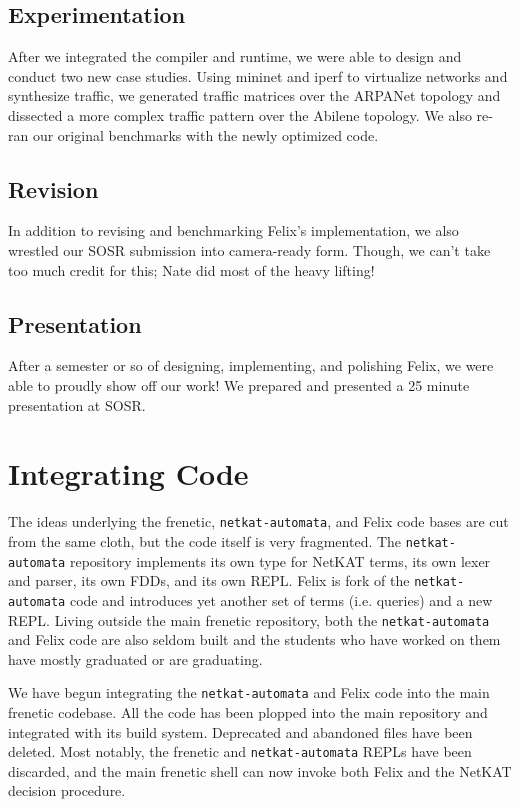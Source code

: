 \documentclass{hw}
\newcommand{\netauto}{\texttt{netkat-automata}}
\begin{document}
\subsection{Experimentation}
After we integrated the compiler and runtime, we were able to design and
conduct two new case studies. Using mininet and iperf to virtualize networks
and synthesize traffic, we generated traffic matrices over the ARPANet topology
and dissected a more complex traffic pattern over the Abilene topology. We also
re-ran our original benchmarks with the newly optimized code.

\subsection{Revision}
In addition to revising and benchmarking Felix's implementation, we also
wrestled our SOSR submission into camera-ready form. Though, we can't take too
much credit for this; Nate did most of the heavy lifting!

\subsection{Presentation}
After a semester or so of designing, implementing, and polishing Felix, we were
able to proudly show off our work! We prepared and presented a 25 minute
presentation at SOSR.

\section{Integrating Code}
The ideas underlying the frenetic, \netauto{}, and Felix code bases are cut
from the same cloth, but the code itself is very fragmented. The \netauto{}
repository implements its own type for NetKAT terms, its own lexer and parser,
its own FDDs, and its own REPL. Felix is fork of the \netauto{} code and
introduces yet another set of terms (i.e. queries) and a new REPL. Living
outside the main frenetic repository, both the \netauto{} and Felix code are
also seldom built and the students who have worked on them have mostly
graduated or are graduating.

We have begun integrating the \netauto{} and Felix code into the main frenetic
codebase. All the code has been plopped into the main repository and integrated
with its build system. Deprecated and abandoned files have been deleted. Most
notably, the frenetic and \netauto{} REPLs have been discarded, and the main
frenetic shell can now invoke both Felix and the NetKAT decision procedure.
\end{document}

